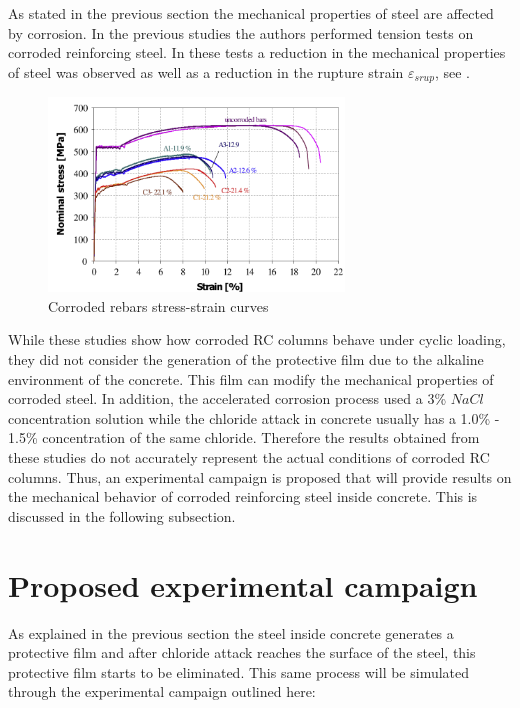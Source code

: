 As stated in the previous section the mechanical properties of steel are affected by corrosion. In the previous studies \cite{Meda2014} the authors performed tension tests on corroded reinforcing steel. In these tests a reduction in the mechanical properties of steel was observed as well as a reduction in the rupture strain $\varepsilon_{srup}$, see . 

\begin{figure}[htbp]
	\centering
	\includegraphics[width=0.7\textwidth]{Chapter-3/figs/Meda_StressStrain}
	\caption{Corroded rebars stress-strain curves \cite{Meda2014}}
	\label{fig:Meda_RebarTest}
\end{figure}

While these studies show how corroded RC columns behave under cyclic loading, they did not consider the generation of the protective film due to the alkaline environment of the concrete. This film can modify the mechanical properties of corroded steel. In addition, the accelerated corrosion process used a 3\% $NaCl$ concentration solution while the chloride attack in concrete usually has a 1.0\% - 1.5\% concentration of the same chloride. Therefore the results obtained from these studies do not accurately represent the actual conditions of corroded RC columns. Thus, an experimental campaign is proposed that will provide results on the mechanical behavior of corroded reinforcing steel inside concrete. This is discussed in the following subsection.

\section{Proposed experimental campaign}

As explained in the previous section the steel inside concrete generates a protective film and after chloride attack reaches the surface of the steel, this protective film starts to be eliminated. This same process will be simulated through the experimental campaign outlined here:

